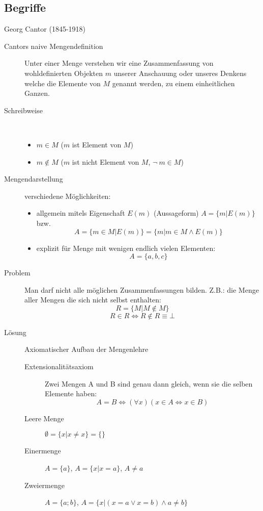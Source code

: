 \subsection{Begriffe}
Georg Cantor (1845-1918)
\begin{description}
    \item[Cantors naive Mengendefinition] Unter einer Menge verstehen wir eine Zusammenfassung von wohldefinierten Objekten $m$ unserer Anschauung oder unseres Denkens welche die Elemente von $M$ genannt werden, zu einem einheitlichen Ganzen.
    \item[Schreibweise]\
    \begin{itemize}
        \item $m \in M$ ($m$ ist Element von $M$)
        \item $m \not\in M$ ($m$ ist nicht Element von $M$, $\neg\ m \in M$)
    \end{itemize}
    \item[Mengendarstellung] verschiedene Möglichkeiten:
    \begin{itemize}
        \item allgemein mitels Eigenschaft $E(m)$ (Aussageform) $A=\lbrace m|E(m) \rbrace$ bzw.
        $$A = \lbrace m \in M | E(m) \rbrace = \lbrace m | m \in M \wedge E(m) \rbrace$$
        \item explizit für Menge mit wenigen endlich vielen Elementen:
        $$A=\lbrace a, b, c\rbrace$$
    \end{itemize}
    \item[Problem] Man darf nicht alle möglichen Zusammenfassungen bilden. Z.B.: die Menge aller Mengen die sich nicht selbst enthalten:
    $$R=\lbrace M | M \not \in M \rbrace$$
    $$R \in R \Leftrightarrow R \not \in R \equiv \bot$$
    \item[Lösung] Axiomatischer Aufbau der Mengenlehre
    \begin{description}
        \item[Extensionalitätsaxiom] Zwei Mengen A und B sind genau dann gleich, wenn sie die selben Elemente haben:
        $$A = B \Leftrightarrow (\forall x)(x \in A \Leftrightarrow x \in B)$$
        \item[Leere Menge] $\emptyset = \lbrace x | x \not = x\rbrace = \lbrace\rbrace$
        \item[Einermenge] $A=\lbrace a \rbrace$, $A = \lbrace x | x = a \rbrace$, $A \not = a$
        \item[Zweiermenge] $A=\lbrace a; b \rbrace$, $A = \lbrace x|(x=a \vee x=b) \wedge a \not = b \rbrace$

\end{description}
\end{description}
